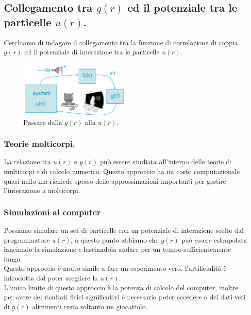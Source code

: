 \subsection{Collegamento tra $g(r)$ ed il potenziale tra le particelle $u(r)$.}
\label{subsec:Collegamento tra $g(r)$ ed il potenziale tra le particelle $u(r)$.}
Cerchiamo di indagare il collegamento tra la funzione di correlazione di coppia $g(r)$ ed il potenziale di interazione tra le particelle $u(r) $. 
\begin{figure}[H]
	\centering
	\includegraphics[width=0.5\textwidth]{figures/schema-iniziale-ur-gr.png}
	\caption{Passare dalla $g(r)$ alla $u(r)$.}
	\label{fig:ur-gr}
\end{figure}
\subsubsection{Teorie molticorpi.}
\label{subsubsec:Teorie molticorpi.}
La relazione tra $u(r)$ e $g(r)$ può essere studiata all'interno delle teorie di multicorpi e di calcolo numerico. Questo approccio ha un costo computazionale quasi nullo ma richiede spesso delle approssimazioni importanti per gestire l'interazione a molticorpi.
\subsubsection{Simulazioni al computer}
\label{subsubsec:Simulazioni al computer}
Possiamo simulare un set di particelle con un potenziale di interazione scelto dal programmatore $u(r)$, a questo punto abbiamo che $g(r)$ può essere estrapolata lanciando la simulazione e lasciandola andare per un tempo sufficientemente lungo.\\
Questo approccio è molto simile a fare un esperimento vero, l'artificialità è introdotta dal poter scegliere la $u(r)$. \\
L'unico limite di questo approccio è la potenza di calcolo del computer, inoltre per avere dei risultati fisici significativi è necessario poter accedere a dei dati veri di $g(r)$ altrimenti resta soltanto un giocattolo.
